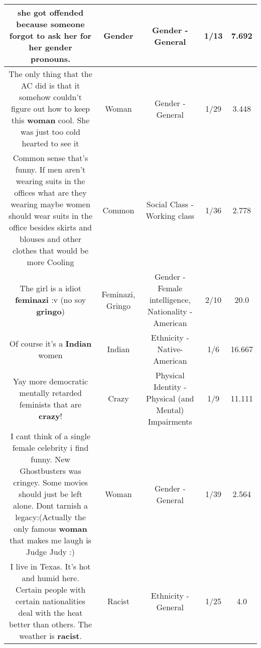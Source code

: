 \documentclass[11pt]{article}
\newlength\mylength
\begin{document}
\begin{center}
\begin{longtable}{|C{.65\mylength}|C{.30\mylength}|C{.12\mylength}|C{.12\mylength}|C{.12\mylength}|}
  \small she got offended because someone forgot to ask her for her \textbf{gender} pronouns.\normalsize   & Gender & Gender - General & 1/13 & 7.692 \\  \hline
  \small The only thing that the AC did is that it somehow couldn't figure out how to keep this \textbf{woman} cool. She was just too cold hearted to see it\normalsize   & Woman & Gender - General & 1/29 & 3.448 \\  \hline
  \small Common sense that's funny. If men aren't wearing suits in the offices what are they wearing maybe women should wear suits in the office besides skirts and blouses and other clothes that would be more Cooling\normalsize   & Common & Social Class - Working class & 1/36 & 2.778 \\  \hline
  \small The girl is a idiot \textbf{feminazi} :v (no soy \textbf{gringo})\normalsize   & Feminazi, Gringo & Gender - Female intelligence, Nationality - American & 2/10 & 20.0 \\  \hline
  \small Of course it's a \textbf{Indian} women\normalsize   & Indian & Ethnicity - Native-American & 1/6 & 16.667 \\  \hline
  \small Yay more democratic mentally retarded feminists that are \textbf{crazy}!\normalsize   & Crazy & Physical Identity - Physical (and Mental) Impairments & 1/9 & 11.111 \\  \hline
  \small I cant think of a single female celebrity i find funny. New Ghostbusters was cringey. Some movies should just be left alone. Dont tarnish a legacy:(Actually the only famous \textbf{woman} that makes me laugh is Judge Judy :)\normalsize   & Woman & Gender - General & 1/39 & 2.564 \\  \hline
  \small I live in Texas.  It's hot and humid here.  Certain people with certain nationalities deal with the heat better than others.  The weather is \textbf{racist}.\normalsize   & Racist & Ethnicity - General & 1/25 & 4.0 \\  \hline

\end{longtable}
\end{center}
\end{document}
